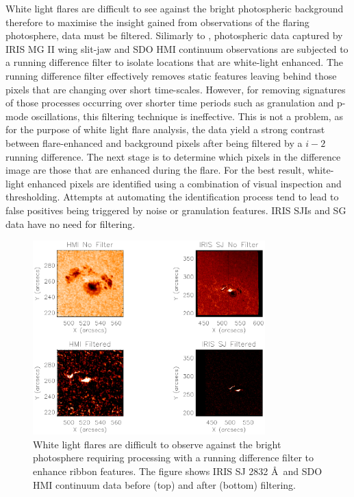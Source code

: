 White light flares are difficult to see against the bright photospheric background therefore to maximise the insight gained from observations of the flaring photosphere, data must be filtered. Silimarly to \cite{2014ApJ...783...98K}, photospheric data captured by IRIS MG II wing slit-jaw and SDO HMI continuum observations are subjected to a running difference filter to isolate locations that are white-light enhanced. The running difference filter effectively removes static features leaving behind those pixels that are changing over short time-scales. However, for removing signatures of those processes occurring over shorter time periods such as granulation and p-mode oscillations, this filtering technique is ineffective. This is not a problem, as for the purpose of white light flare analysis, the data yield a strong contrast between flare-enhanced and background pixels after being filtered by a $i-2$ running difference. The next stage is to determine which pixels in the difference image are those that are enhanced during the flare. For the best result, white-light enhanced pixels are identified using a combination of visual inspection and thresholding. Attempts at automating the identification process tend to lead to false positives being triggered by noise or granulation features. IRIS SJIs and SG data have no need for filtering.

\begin{figure}[H]
  \begin{center}
  \includegraphics[width=0.8\textwidth]{29-Mar-14-diff-examples}
  \end{center}
  \caption{White light flares are difficult to observe against the bright photosphere requiring processing with a running difference filter to enhance ribbon features. The figure shows IRIS SJ 2832 \AA\ and SDO HMI continuum data before (top) and after (bottom) filtering.}\label{dif_filter}
\end{figure}

